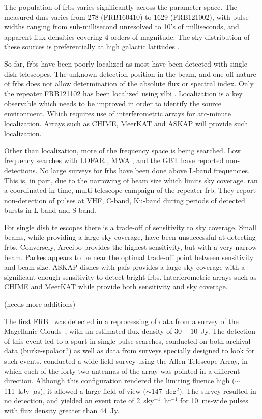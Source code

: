\documentclass[a4paper,fleqn,usenatbib]{mnras}
\begin{document}
The population of \glspl{frb} varies significantly across the parameter space.
The measured \glspl{dm} varies from 278 (FRB160410) to 1629 (FRB121002), with
pulse widths ranging from sub-millisecond unresolved to 10's of milliseconds,
and apparent flux densities covering 4 orders of magnitude. The sky distribution
of these sources is preferentially at high galactic latitudes
\citep{2015MNRAS.451.3278M}.

So far, \glspl{frb} have been poorly localized as most have been detected with
single dish telescopes. The unknown detection position in the beam, and one-off
nature of \glspl{frb} does not allow determination of the absolute flux or
spectral index. Only the repeater FRB121102 has been localized using \gls{vlbi}
\citep{2017ApJ...834L...8M, 2017ApJ...834L...7T}. Localization is a key
observable which needs to be improved in order to identify the source
environment. Which requires use of interferometric arrays for arc-minute
localization. Arrays such as CHIME, MeerKAT and ASKAP will provide such
localization.

Other than localization, more of the frequency space is being searched. Low
frequency searches with LOFAR \citep{2015MNRAS.452.1254K}, MWA
\citep{2015AJ....150..199T}, and the GBT \citep{2017arXiv170107457C} have
reported non-detections.  No large surveys for \glspl{frb} have been done above
L-band frequencies. This is, in part, due to the narrowing of beam size which
limits sky coverage.  \cite{2017arXiv170507553L} ran a coordinated-in-time,
multi-telescope campaign of the repeater \gls{frb}.  They report non-detection
of pulses at VHF, C-band, Ku-band during periods of detected bursts in L-band
and S-band.

For single dish telescopes there is a trade-off of sensitivity to sky coverage.
Small beams, while providing a large sky coverage, have been unsuccessful at
detecting \glspl{frb}. Conversely, Arecibo provides the highest sensitivity, but
with a very narrow beam. Parkes appears to be near the optimal trade-off point
between sensitivity and beam size.  ASKAP dishes with \glspl{paf} provides a
large sky coverage with a significant enough sensitivity to detect bright
\glspl{frb}. Interferometric arrays such as CHIME and MeerKAT while provide both
sensitivity and sky coverage.

(needs more additions)

The first FRB~\citep{2007Sci...318..777L} was detected in a reprocessing of data from a survey of the Magellanic Clouds~\citep{2006ApJ...649..235M}, with an estimated flux density of $30\pm10$~Jy. The detection of this event led to a spurt in single pulse searches, conducted on both archival data (burke-spolaor?) as well as data from surveys specially designed to look for such events. \citet{2012ApJ...744..109S} conducted a wide-field survey using the Allen Telescope Array, in which each of the forty two antennas of the array was pointed in a different direction. Although this configuration rendered the limiting fluence high ($\sim$111~kJy~$\mu$s), it allowed a large field of view ($\sim$147~deg$^2$). The survey resulted in no detection, and yielded an event rate of 2~sky$^{-1}$~hr$^{-1}$ for 10~ms-wide pulses with flux density greater than 44~Jy.
\end{document}
